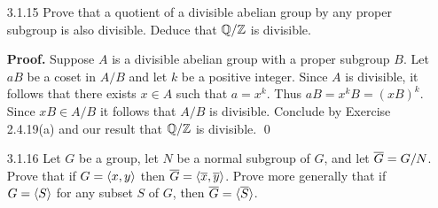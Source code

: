 \begin{enumerate}
\begin{enumerate}
               $q + \Z \mapsto e^{2\pi i q}$. First we will show that this map
               is well defined. So suppose that $p + \Z = q + \Z$ for some
               cosets in $\Q/\Z$, so that $p - q = n \in \Z$ (Proposition 4).
               Now we have that
               $$\alpha(p + \Z) = e^{2\pi i p} = e^{2\pi i (n+q)} = 
                 e^{2\pi i n}e^{2\pi i q} = 1 \cdot e^{2\pi i q} = 
                 \alpha(q + \Z).$$
               Hence $\alpha$ is well defined, and it is a homomorphism because
               $$\alpha((p + \Z) + (q + \Z)) = \alpha((p + q) + \Z) =
                 e^{2\pi i (p+q)} = e^{2\pi i p}e^{2\pi i q} = \alpha(p + \Z)
                 \alpha(q + \Z),$$
               for all $p + \Z, q + \Z \in \Q/\Z$. Now observe that 
               $\alpha(a + \Z) = e^{2\pi i a} = 1$ if and only if $a$ is an 
               integer if and only if $a + \Z = \Z$. Thus the kernel of
               $\alpha$ is trivial so that $\alpha$ is injective by Exercise 
               1.6.14. Let $z \in H$. Then $z^m = 1$ for some positive integer
               $m$. It follows that $z = e^{2\pi i/m}$ for some integer $i$.
               Surjectivity of $\alpha$ follows $\alpha(1/m + \Z) = z$. Conclude
               that $\alpha$ is an isomorphism, so that $\Q/\Z \cong H$.
      \end{enumerate} \qed
   \item[3.1.15]  Prove that a quotient of a divisible abelian group by any
                  proper subgroup is also divisible. Deduce that $\Q/\Z$ is
                  divisible.

      \textbf{Proof.} Suppose $A$ is a divisible abelian group with a proper
      subgroup $B$. Let $aB$ be a coset in $A/B$ and let $k$ be a positive
      integer. Since $A$ is divisible, it follows that there exists $x \in A$
      such that $a = x^k$. Thus $aB = x^kB = (xB)^k$. Since $xB \in A/B$ it
      follows that $A/B$ is divisible. Conclude by Exercise 2.4.19(a) and our
      result that $\Q/\Z$ is divisible. \qed
   \item[3.1.16]  Let $G$ be a group, let $N$ be a normal subgroup of $G$, and
                  let $\overline{G} = G/N$. Prove that if $G = \langle x, y \rangle$ then
                  $\overline{G} = \langle \overline{x}, \overline{y} \rangle$. Prove more generally that if
                  $G =\langle S \rangle$ for any subset $S$ of $G$, then
                  $\overline{G} = \langle \overline{S} \rangle$.


\end{enumerate}
